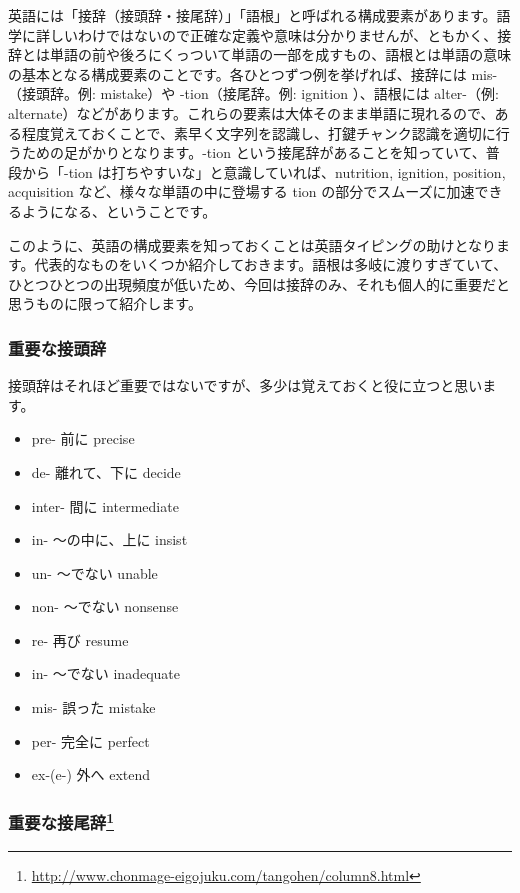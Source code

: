 英語には「接辞（接頭辞・接尾辞）」「語根」と呼ばれる構成要素があります。語学に詳しいわけではないので正確な定義や意味は分かりませんが、ともかく、接辞とは単語の前や後ろにくっついて単語の一部を成すもの、語根とは単語の意味の基本となる構成要素のことです。各ひとつずつ例を挙げれば、接辞には mis-（接頭辞。例: mistake）や -tion（接尾辞。例: ignition ）、語根には alter-（例: alternate）などがあります。これらの要素は大体そのまま単語に現れるので、ある程度覚えておくことで、素早く文字列を認識し、打鍵チャンク認識を適切に行うための足がかりとなります。-tion という接尾辞があることを知っていて、普段から「-tion は打ちやすいな」と意識していれば、nutrition, ignition, position, acquisition など、様々な単語の中に登場する tion の部分でスムーズに加速できるようになる、ということです。

このように、英語の構成要素を知っておくことは英語タイピングの助けとなります。代表的なものをいくつか紹介しておきます。語根は多岐に渡りすぎていて、ひとつひとつの出現頻度が低いため、今回は接辞のみ、それも個人的に重要だと思うものに限って紹介します。

\subsubsection*{重要な接頭辞}
接頭辞はそれほど重要ではないですが、多少は覚えておくと役に立つと思います。
\begin{itemize}
 \item pre- 前に precise
 \item de- 離れて、下に decide
 \item inter- 間に intermediate
 \item in- ～の中に、上に insist
 \item un- ～でない unable
 \item non- ～でない nonsense
 \item re- 再び resume
 \item in- ～でない inadequate
 \item mis- 誤った mistake
 \item per- 完全に perfect
 \item ex-(e-) 外へ extend
\end{itemize}

\subsubsection*{重要な接尾辞\footnote{\url{http://www.chonmage-eigojuku.com/tangohen/column8.html}}}

